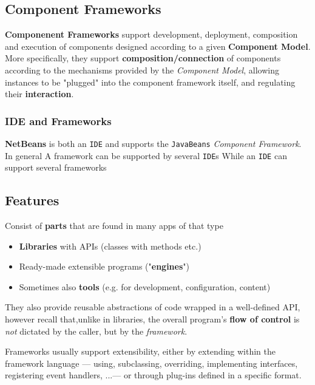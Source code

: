 \subsection{Component Frameworks}
\textbf{Componenent Frameworks} support development, deployment, composition
and execution of components designed according to a given
\textbf{Component Model}.
More specifically, they support \textbf{composition/connection} of components according to
the mechanisms provided by the \textit{Component Model},
allowing instances to be "plugged" into the
component framework itself,
and regulating their \textbf{interaction}.

\subsubsection{IDE and Frameworks}
\textbf{NetBeans} is both an \texttt{IDE} and supports the \texttt{JavaBeans} \textit{Component Framework}.\\
In general A framework can be supported by several \texttt{IDE}s
While an \texttt{IDE} can support several frameworks

\subsection{Features}
Consist of \textbf{parts} that are found in many apps of that type
\begin{itemize}
   \item \textbf{Libraries} with APIs (classes with methods etc.)
   \item Ready-made extensible programs ("\textbf{engines}")
   \item Sometimes also \textbf{tools} (e.g. for development, configuration,
   content)
\end{itemize}
They also provide reusable abstractions of code wrapped in a well-defined API,
however recall that,unlike in libraries,
the overall program's \textbf{flow of control} is \textit{not} dictated by the caller, but by the \textit{framework}.
\nl

Frameworks usually support extensibility,
either by extending within the framework language {---} using, subclassing, overriding, implementing interfaces, registering event handlers, ...{---} or through plug-ins defined in a specific format.
 

